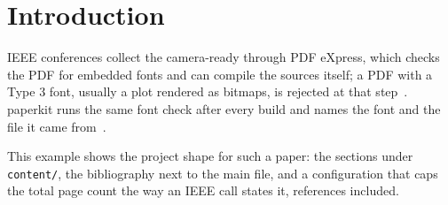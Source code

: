 \section{Introduction}

IEEE conferences collect the camera-ready through PDF eXpress, which checks
the PDF for embedded fonts and can compile the sources itself; a PDF with a
Type 3 font, usually a plot rendered as bitmaps, is rejected at that
step~\cite{ieeetran}. paperkit runs the same font check after every build and
names the font and the file it came from~\cite{reproducible}.

This example shows the project shape for such a paper: the sections under
\texttt{content/}, the bibliography next to the main file, and a configuration
that caps the total page count the way an IEEE call states it, references
included.
